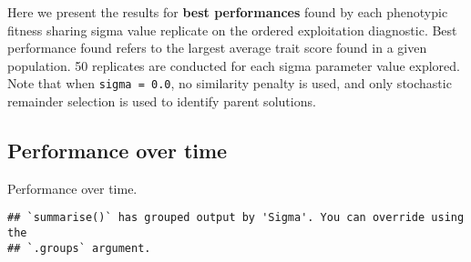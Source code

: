 \documentclass[]{book}
\newenvironment{Shaded}{\begin{snugshade}}{\end{snugshade}}
\newcommand{\DataTypeTok}[1]{\textcolor[rgb]{0.13,0.29,0.53}{#1}}
\newcommand{\KeywordTok}[1]{\textcolor[rgb]{0.13,0.29,0.53}{\textbf{#1}}}
\newcommand{\NormalTok}[1]{#1}
\newcommand{\OperatorTok}[1]{\textcolor[rgb]{0.81,0.36,0.00}{\textbf{#1}}}
\newcommand{\StringTok}[1]{\textcolor[rgb]{0.31,0.60,0.02}{#1}}
\begin{document}
Here we present the results for \textbf{best performances} found by each phenotypic fitness sharing sigma value replicate on the ordered exploitation diagnostic.
Best performance found refers to the largest average trait score found in a given population.
50 replicates are conducted for each sigma parameter value explored.
Note that when \texttt{sigma\ =\ 0.0}, no similarity penalty is used, and only stochastic remainder selection is used to identify parent solutions.

\hypertarget{performance-over-time-15}{%
\subsection{Performance over time}\label{performance-over-time-15}}

Performance over time.

\begin{Shaded}
\end{Shaded}

\begin{verbatim}
## `summarise()` has grouped output by 'Sigma'. You can override using the
## `.groups` argument.
\end{verbatim}
\end{document}
